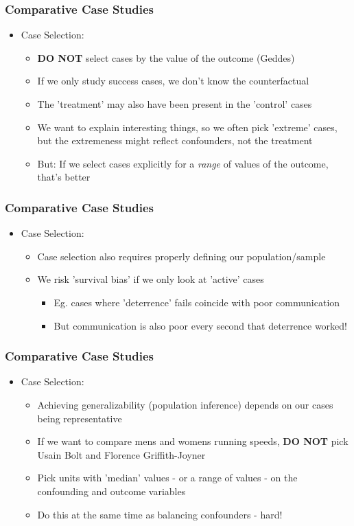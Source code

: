 \documentclass[xcolor=x11names,compress]{beamer}\usepackage[]{graphicx}\usepackage[]{color}
\renewcommand{\(}{\begin{columns}}
\renewcommand{\)}{\end{columns}}
\newcommand{\<}[1]{\begin{column}{#1}}
\renewcommand{\>}{\end{column}}
\begin{document}
\begin{frame}
\frametitle{Comparative Case Studies}
\begin{itemize}
\item Case Selection:
\pause
\begin{itemize}
\item \textbf{DO NOT} select cases by the value of the outcome (Geddes)
\pause
\item If we only study success cases, we don't know the counterfactual
\pause
\item The 'treatment' may also have been present in the 'control' cases
\pause
\item We want to explain interesting things, so we often pick 'extreme' cases, but the extremeness might reflect confounders, not the treatment
\pause
\item But: If we select cases explicitly for a \textit{range} of values of the outcome, that's better
\end{itemize}
\end{itemize}
\end{frame}

\begin{frame}
\frametitle{Comparative Case Studies}
\begin{itemize}
\item Case Selection:
\pause
\begin{itemize}
\item Case selection also requires properly defining our population/sample
\pause
\item We risk 'survival bias' if we only look at 'active' cases
\pause
\begin{itemize}
\item Eg. cases where 'deterrence' fails coincide with poor communication
\pause
\item But communication is also poor every second that deterrence worked!
\end{itemize}
\end{itemize}
\end{itemize}
\end{frame}

\begin{frame}
\frametitle{Comparative Case Studies}
\begin{itemize}
\item Case Selection:
\pause
\begin{itemize}
\item Achieving generalizability (population inference) depends on our cases being representative
\pause
\item If we want to compare mens and womens running speeds, \textbf{DO NOT} pick Usain Bolt and Florence Griffith-Joyner
\pause
\item Pick units with 'median' values - or a range of values - on the confounding and outcome variables
\pause
\item Do this at the same time as balancing confounders - hard!
\end{itemize}
\end{itemize}
\end{frame}
\end{document}
